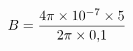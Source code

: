 \documentclass[preview]{standalone}
\begin{document}
\begin{align*}
\special{dvisvgm:raw <g id='unique000'>}B=\frac{4{{\pi}}\times10^{-7}\times5}{2{{\pi}}\times0{,}1}\special{dvisvgm:raw </g>}
\end{align*}
\end{document}
